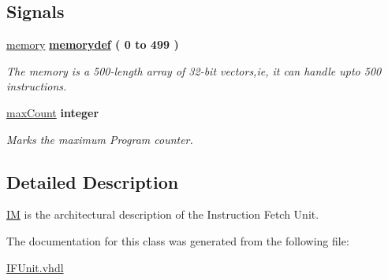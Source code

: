 \subsection*{Signals}
 \begin{DoxyCompactItemize}
\item 
\hypertarget{class_i_f_unit_1_1_i_m_aff51e4a7013bba9d20b780a6cbb74355}{\hyperlink{class_i_f_unit_1_1_i_m_aff51e4a7013bba9d20b780a6cbb74355}{memory} {\bfseries {\bfseries \hyperlink{class_i_f_unit_1_1_i_m_a49bac0fe5abc88bc74320eabd2613b1f}{memorydef}} \textcolor{vhdlchar}{ }\textcolor{vhdlchar}{(}\textcolor{vhdlchar}{ } \textcolor{vhdldigit}{0} \textcolor{vhdlchar}{ }\textcolor{vhdlchar}{ }\textcolor{vhdlchar}{ }\textcolor{vhdlkeyword}{to}\textcolor{vhdlchar}{ }\textcolor{vhdlchar}{ }\textcolor{vhdlchar}{ } \textcolor{vhdldigit}{499} \textcolor{vhdlchar}{ }\textcolor{vhdlchar}{)}\textcolor{vhdlchar}{ }} }\label{class_i_f_unit_1_1_i_m_aff51e4a7013bba9d20b780a6cbb74355}

\begin{DoxyCompactList}\small\item\em The memory is a 500-\/length array of 32-\/bit vectors,ie, it can handle upto 500 instructions. \end{DoxyCompactList}\item 
\hypertarget{class_i_f_unit_1_1_i_m_ade171b0fc4e5e65e8b838a33506afea3}{\hyperlink{class_i_f_unit_1_1_i_m_ade171b0fc4e5e65e8b838a33506afea3}{max\-Count} {\bfseries \textcolor{comment}{integer}\textcolor{vhdlchar}{ }} }\label{class_i_f_unit_1_1_i_m_ade171b0fc4e5e65e8b838a33506afea3}

\begin{DoxyCompactList}\small\item\em Marks the maximum Program counter. \end{DoxyCompactList}\end{DoxyCompactItemize}


\subsection{Detailed Description}
\hyperlink{class_i_f_unit_1_1_i_m}{I\-M} is the architectural description of the Instruction Fetch Unit. 

The documentation for this class was generated from the following file\-:\begin{DoxyCompactItemize}
\item 
\hyperlink{_i_f_unit_8vhdl}{I\-F\-Unit.\-vhdl}\end{DoxyCompactItemize}
